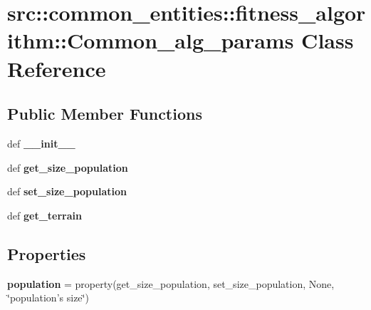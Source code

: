 \hypertarget{classsrc_1_1common__entities_1_1fitness__algorithm_1_1Common__alg__params}{
\section{src::common\_\-entities::fitness\_\-algorithm::Common\_\-alg\_\-params Class Reference}
\label{classsrc_1_1common__entities_1_1fitness__algorithm_1_1Common__alg__params}
}
\subsection*{Public Member Functions}
\begin{DoxyCompactItemize}
\item 
\hypertarget{classsrc_1_1common__entities_1_1fitness__algorithm_1_1Common__alg__params_a8ba4bff8aee0836cd6440f04e5b0d45a}{
def {\bfseries \_\-\_\-init\_\-\_\-}}
\label{classsrc_1_1common__entities_1_1fitness__algorithm_1_1Common__alg__params_a8ba4bff8aee0836cd6440f04e5b0d45a}

\item 
\hypertarget{classsrc_1_1common__entities_1_1fitness__algorithm_1_1Common__alg__params_a9889b3c186d2f141688b854cf61354a7}{
def {\bfseries get\_\-size\_\-population}}
\label{classsrc_1_1common__entities_1_1fitness__algorithm_1_1Common__alg__params_a9889b3c186d2f141688b854cf61354a7}

\item 
\hypertarget{classsrc_1_1common__entities_1_1fitness__algorithm_1_1Common__alg__params_ae2a6d2944a7f7927d57eb983f3f9e688}{
def {\bfseries set\_\-size\_\-population}}
\label{classsrc_1_1common__entities_1_1fitness__algorithm_1_1Common__alg__params_ae2a6d2944a7f7927d57eb983f3f9e688}

\item 
\hypertarget{classsrc_1_1common__entities_1_1fitness__algorithm_1_1Common__alg__params_a0dcc77b15189e10e1cf8c92895237482}{
def {\bfseries get\_\-terrain}}
\label{classsrc_1_1common__entities_1_1fitness__algorithm_1_1Common__alg__params_a0dcc77b15189e10e1cf8c92895237482}

\end{DoxyCompactItemize}
\subsection*{Properties}
\begin{DoxyCompactItemize}
\item 
\hypertarget{classsrc_1_1common__entities_1_1fitness__algorithm_1_1Common__alg__params_ad9bbac5eca6323f5ac25a1252c17ef15}{
{\bfseries population} = property(get\_\-size\_\-population, set\_\-size\_\-population, None, \char`\"{}population's size\char`\"{})}
\label{classsrc_1_1common__entities_1_1fitness__algorithm_1_1Common__alg__params_ad9bbac5eca6323f5ac25a1252c17ef15}

\end{DoxyCompactItemize}


